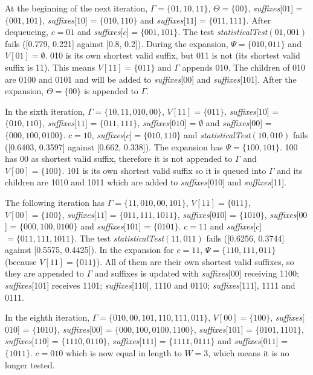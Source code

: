 {At the beginning of the next iteration, $\Gamma = \{01, 10, 11\}$, $\Theta = \{00\}$, \textit{suffixes}[$01$] = $\{001, 101\}$, \textit{suffixes}[$10$] = $\{010, 110\}$ and \textit{suffixes}[$11$] = $\{011, 111\}$. After dequeueing, $c = 01$ and \textit{suffixes}[$c$]$ = \{001, 101\}$. The test \textit{statisticalTest}$(01,001)$ fails ([0.779, 0.221] against [0.8, 0.2]). During the expansion, $\Psi = \{010, 011\}$ and $V[01] = \emptyset$. 010 is its own shortest valid suffix, but 011 is not (its shortest valid suffix is 11). This means $V[11] = \{011\}$ and $\Gamma$ appends 010. The children of 010 are 0100 and 0101 and will be added to \textit{suffixes}[00] and \textit{suffixes}[101]. After the expansion, $\Theta = \{00\}$ is appended to $\Gamma$.

In the sixth iteration, $\Gamma = \{10, 11, 010, 00\}$, $V[11] = \{011\}$, \textit{suffixes}[$10$] = $\{010, 110\}$, \textit{suffixes}[$11$] = $\{011, 111\}$,  \textit{suffixes}[$010$] = $\emptyset$ and  \textit{suffixes}[$00$] = $\{000, 100, 0100\}$. $c = 10$, \textit{suffixes}[$c$]$ = \{010, 110\}$ and \textit{statisticalTest}$(10,010)$ fails ([0.6403, 0.3597] against [0.662, 0.338]). The expansion has $\Psi = \{100, 101\}$. 100 has 00 as shortest valid suffix, therefore it is not appended to $\Gamma$ and $V[00] = \{100\}$. 101 is its own shortest valid suffix so it is queued into $\Gamma$ and its children are 1010 and 1011 which are added to \textit{suffixes}[010] and \textit{suffixes}[11].

The following iteration has $\Gamma = \{11, 010, 00, 101\}$, $V[11] = \{011\}$, $V[00] = \{100\}$, \textit{suffixes}[$11$] = $\{011, 111, 1011\}$,  \textit{suffixes}[$010$] = $\{1010\}$, \textit{suffixes}[$00$] = $\{000, 100, 0100\}$ and \textit{suffixes}[$101$] = $\{0101\}$. $c = 11$ and \textit{suffixes}[$c$]$ = \{011, 111, 1011\}$. The test \textit{statisticalTest}$(11,011)$ fails ([0.6256, 0.3744] against [0.5575, 0.4425]). In the expansion for $c = 11$, $\Psi = \{110, 111, 011\}$ (because $V[11] = \{011\}$).  All of them are their own shortest valid suffixes, so they are appended to $\Gamma$ and suffixes is updated with \textit{suffixes}[00] receiving 1100; \textit{suffixes}[101] receives 1101; \textit{suffixes}[110], 1110 and 0110; \textit{suffixes}[111], 1111 and 0111.

In the eighth iteration, $\Gamma = \{010, 00, 101, 110, 111, 011\}$, $V[00] = \{100\}$, \textit{suffixes}[$010$] = $\{1010\}$, \textit{suffixes}[$00$] = $\{000, 100, 0100, 1100\}$, \textit{suffixes}[$101$] = $\{0101, 1101\}$, \textit{suffixes}[$110$] = $\{1110, 0110\}$, \textit{suffixes}[$111$] = $\{1111, 0111\}$ and \textit{suffixes}[$011$] = $\{1011\}$. $c = 010$ which is now equal in length to $W = 3$, which means it is no longer tested.

}
